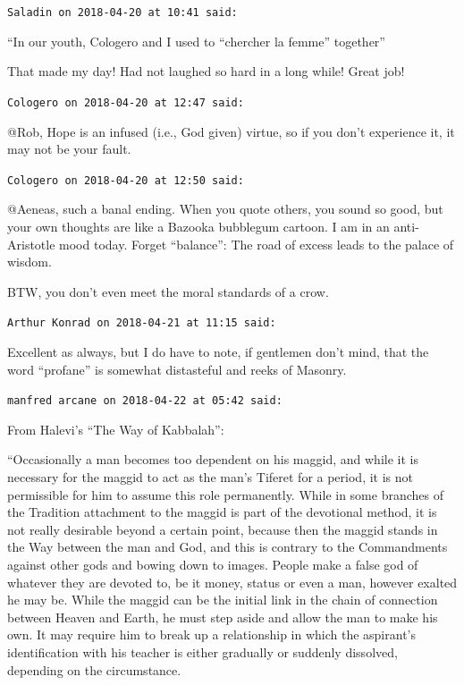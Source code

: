 \begin{footnotesize}
\begin{sffamily}
\hfill

\texttt{Saladin on 2018-04-20 at 10:41 said:}

``In our youth, Cologero and I used to ``chercher la femme'' together''

That made my day! Had not laughed so hard in a long while! Great job!

\hfill

\texttt{Cologero on 2018-04-20 at 12:47 said:}

@Rob, Hope is an infused (i.e., God given) virtue, so if you don't experience it, it may not be your fault.

\hfill

\texttt{Cologero on 2018-04-20 at 12:50 said:}

@Aeneas, such a banal ending. When you quote others, you sound so good, but your own thoughts are like a Bazooka bubblegum cartoon. I am in an anti-Aristotle mood today. Forget ``balance'': The road of excess leads to the palace of wisdom.

BTW, you don't even meet the moral standards of a crow.

\hfill

\texttt{Arthur Konrad on 2018-04-21 at 11:15 said:}

Excellent as always, but I do have to note, if gentlemen don't mind, that the word ``profane'' is somewhat distasteful and reeks of Masonry.

\hfill

\texttt{manfred arcane on 2018-04-22 at 05:42 said:}

From Halevi's ``The Way of Kabbalah'':

``Occasionally a man becomes too dependent on his maggid, and while it is necessary for the maggid to act as the man's Tiferet for a period, it is not permissible for him to assume this role permanently. While in some branches of the Tradition attachment to the maggid is part of the devotional method, it is not really desirable beyond a certain point, because then the maggid stands in the Way between the man and God, and this is contrary to the Commandments against other gods and bowing down to images. People make a false god of whatever they are devoted to, be it money, status or even a man, however exalted he may be. While the maggid can be the initial link in the chain of connection between Heaven and Earth, he must step aside and allow the man to make his own. It may require him to break up a relationship in which the aspirant's identification with his teacher is either gradually or suddenly dissolved, depending on the circumstance.


\end{sffamily}
\end{footnotesize}
